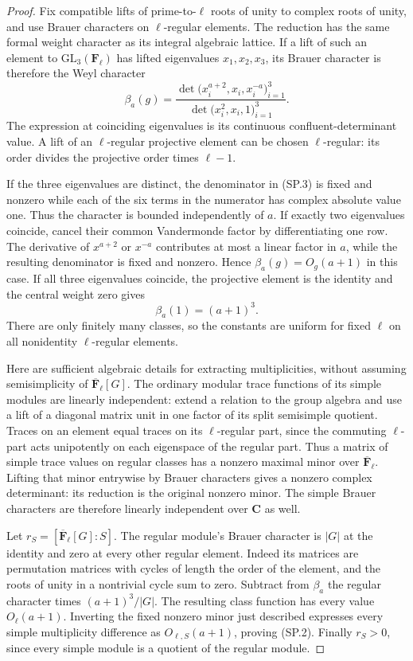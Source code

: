 \begin{proof}
Fix compatible lifts of prime-to-$\ell$ roots of unity to complex
roots of unity, and use Brauer characters on $\ell$-regular
elements. The reduction has the same formal weight character
as its integral algebraic lattice. If a lift of such an element
to $\mathrm{GL}_3(\mathbf F_\ell)$ has lifted eigenvalues
$x_1,x_2,x_3$, its Brauer character is therefore the Weyl
character
\[
 \beta_a(g)=
 \frac{\det\bigl(x_i^{a+2},x_i,x_i^{-a}\bigr)_{i=1}^3}
      {\det\bigl(x_i^2,x_i,1\bigr)_{i=1}^3}.
                                                               \tag{SP.3}
\]
The expression at coinciding eigenvalues is its continuous
confluent-determinant value. A lift of an $\ell$-regular
projective element can be chosen $\ell$-regular: its order
divides the projective order times $\ell-1$.

If the three eigenvalues are distinct, the denominator in
(SP.3) is fixed and nonzero while each of the six terms in
the numerator has complex absolute value one. Thus the
character is bounded independently of $a$. If exactly two
eigenvalues coincide, cancel their common Vandermonde factor
by differentiating one row. The derivative of $x^{a+2}$ or
$x^{-a}$ contributes at most a linear factor in $a$, while
the resulting denominator is fixed and nonzero. Hence
$\beta_a(g)=O_g(a+1)$ in this case. If all three eigenvalues
coincide, the projective element is the identity and the
central weight zero gives
\[
                      \beta_a(1)=(a+1)^3.
                                                               \tag{SP.4}
\]
There are only finitely many classes, so the constants are
uniform for fixed $\ell$ on all nonidentity $\ell$-regular
elements.

Here are sufficient algebraic details for extracting
multiplicities, without assuming semisimplicity of
$\overline{\mathbf F}_\ell[G]$. The ordinary modular trace
functions of its simple modules are linearly independent:
extend a relation to the group algebra and use a lift of a
diagonal matrix unit in one factor of its split semisimple
quotient. Traces on an element equal traces on its
$\ell$-regular part, since the commuting $\ell$-part acts
unipotently on each eigenspace of the regular part. Thus a
matrix of simple trace values on regular classes has a
nonzero maximal minor over $\overline{\mathbf F}_\ell$.
Lifting that minor entrywise by Brauer characters gives a
nonzero complex determinant: its reduction is the original
nonzero minor. The simple Brauer characters are therefore
linearly independent over $\mathbf C$ as well.

Let $r_S=[\overline{\mathbf F}_\ell[G]:S]$. The regular
module's Brauer character is $|G|$ at the identity and
zero at every other regular element. Indeed its matrices
are permutation matrices with cycles of length the order
of the element, and the roots of unity in a nontrivial
cycle sum to zero. Subtract from $\beta_a$ the regular
character times $(a+1)^3/|G|$. The resulting class function
has every value $O_\ell(a+1)$. Inverting the fixed nonzero
minor just described expresses every simple multiplicity
difference as $O_{\ell,S}(a+1)$, proving (SP.2).
Finally $r_S>0$, since every simple module is a quotient
of the regular module.
\end{proof}

